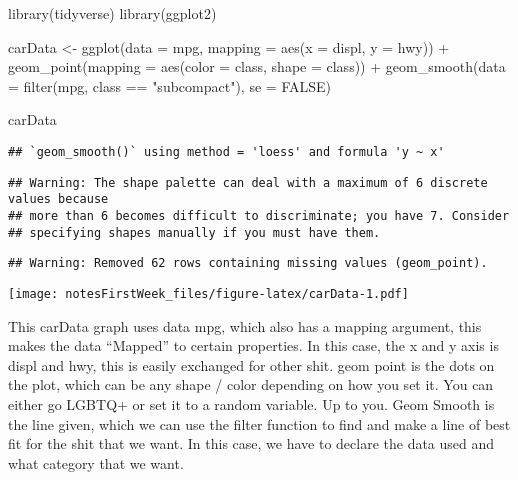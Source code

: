 \documentclass[
]{article}
\newenvironment{Shaded}{\begin{snugshade}}{\end{snugshade}}
\newcommand{\AttributeTok}[1]{\textcolor[rgb]{0.77,0.63,0.00}{#1}}
\newcommand{\ConstantTok}[1]{\textcolor[rgb]{0.00,0.00,0.00}{#1}}
\newcommand{\FunctionTok}[1]{\textcolor[rgb]{0.00,0.00,0.00}{#1}}
\newcommand{\NormalTok}[1]{#1}
\newcommand{\OtherTok}[1]{\textcolor[rgb]{0.56,0.35,0.01}{#1}}
\newcommand{\SpecialCharTok}[1]{\textcolor[rgb]{0.00,0.00,0.00}{#1}}
\newcommand{\StringTok}[1]{\textcolor[rgb]{0.31,0.60,0.02}{#1}}
\begin{document}
\begin{Shaded}
\begin{Highlighting}[]
\FunctionTok{library}\NormalTok{(tidyverse)}
\FunctionTok{library}\NormalTok{(ggplot2)}

\NormalTok{carData }\OtherTok{\textless{}{-}} \FunctionTok{ggplot}\NormalTok{(}\AttributeTok{data =}\NormalTok{ mpg, }\AttributeTok{mapping =} \FunctionTok{aes}\NormalTok{(}\AttributeTok{x =}\NormalTok{ displ, }\AttributeTok{y =}\NormalTok{ hwy)) }\SpecialCharTok{+}
  \FunctionTok{geom\_point}\NormalTok{(}\AttributeTok{mapping =} \FunctionTok{aes}\NormalTok{(}\AttributeTok{color =}\NormalTok{ class, }\AttributeTok{shape =}\NormalTok{ class)) }\SpecialCharTok{+}
  \FunctionTok{geom\_smooth}\NormalTok{(}\AttributeTok{data =} \FunctionTok{filter}\NormalTok{(mpg, class }\SpecialCharTok{==} \StringTok{"subcompact"}\NormalTok{), }\AttributeTok{se =} \ConstantTok{FALSE}\NormalTok{)}

\NormalTok{carData}
\end{Highlighting}
\end{Shaded}

\begin{verbatim}
## `geom_smooth()` using method = 'loess' and formula 'y ~ x'
\end{verbatim}

\begin{verbatim}
## Warning: The shape palette can deal with a maximum of 6 discrete values because
## more than 6 becomes difficult to discriminate; you have 7. Consider
## specifying shapes manually if you must have them.
\end{verbatim}

\begin{verbatim}
## Warning: Removed 62 rows containing missing values (geom_point).
\end{verbatim}

\texttt{[image: notesFirstWeek\_files/figure-latex/carData-1.pdf]}

This carData graph uses data mpg, which also has a mapping argument,
this makes the data ``Mapped'' to certain properties. In this case, the
x and y axis is displ and hwy, this is easily exchanged for other shit.
geom point is the dots on the plot, which can be any shape / color
depending on how you set it. You can either go LGBTQ+ or set it to a
random variable. Up to you. Geom Smooth is the line given, which we can
use the filter function to find and make a line of best fit for the shit
that we want. In this case, we have to declare the data used and what
category that we want.
\end{document}
